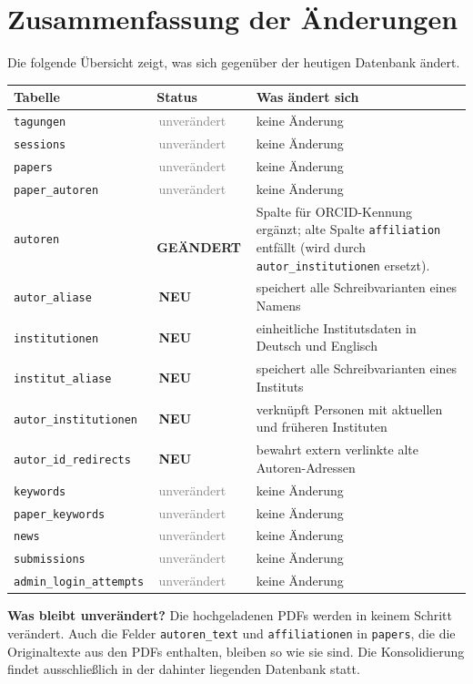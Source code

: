 \documentclass[11pt,a4paper,parskip=half-]{scrartcl}
\newcommand{\tabhead}[1]{\textsf{\textbf{\small\color{accent}#1}}}
\newcommand{\tagneu}{\colorbox{newtag!15}{\textcolor{newtag}{\sffamily\footnotesize\bfseries\,NEU\,}}}
\newcommand{\taggeandert}{\colorbox{changedtag!15}{\textcolor{changedtag}{\sffamily\footnotesize\bfseries\,GEÄNDERT\,}}}
\newcommand{\tagunv}{\textcolor{gray}{\sffamily\footnotesize\,unverändert\,}}
\begin{document}
\clearpage

\section{Zusammenfassung der Änderungen}

Die folgende Übersicht zeigt, was sich gegenüber der heutigen Datenbank
ändert.

\begin{tabularx}{\linewidth}{L{4.6cm} L{2.6cm} X}
\toprule
\tabhead{Tabelle} & \tabhead{Status} & \tabhead{Was ändert sich} \\
\midrule
\texttt{tagungen}                & \tagunv      & keine Änderung \\
\texttt{sessions}                & \tagunv      & keine Änderung \\
\texttt{papers}                  & \tagunv      & keine Änderung \\
\texttt{paper\_autoren}          & \tagunv      & keine Änderung \\
\texttt{autoren}                 & \taggeandert & Spalte für ORCID-Kennung ergänzt; alte Spalte \texttt{affiliation} entfällt (wird durch \texttt{autor\_institutionen} ersetzt). \\
\texttt{autor\_aliase}           & \tagneu      & speichert alle Schreibvarianten eines Namens \\
\texttt{institutionen}           & \tagneu      & einheitliche Institutsdaten in Deutsch und Englisch \\
\texttt{institut\_aliase}        & \tagneu      & speichert alle Schreibvarianten eines Instituts \\
\texttt{autor\_institutionen}    & \tagneu      & verknüpft Personen mit aktuellen und früheren Instituten \\
\texttt{autor\_id\_redirects}    & \tagneu      & bewahrt extern verlinkte alte Autoren-Adressen \\
\texttt{keywords}                & \tagunv      & keine Änderung \\
\texttt{paper\_keywords}         & \tagunv      & keine Änderung \\
\texttt{news}                    & \tagunv      & keine Änderung \\
\texttt{submissions}             & \tagunv      & keine Änderung \\
\texttt{admin\_login\_attempts}  & \tagunv      & keine Änderung \\
\bottomrule
\end{tabularx}

\vspace{1.2em}

\begin{hinweis}
\textbf{Was bleibt unverändert?} Die hochgeladenen PDFs werden in keinem
Schritt verändert. Auch die Felder \texttt{autoren\_text} und
\texttt{affiliationen} in \texttt{papers}, die die Originaltexte aus den
PDFs enthalten, bleiben so wie sie sind. Die Konsolidierung findet
ausschließlich in der dahinter liegenden Datenbank statt.
\end{hinweis}
\end{document}

